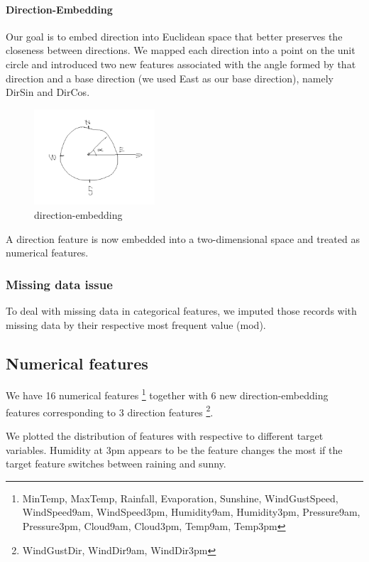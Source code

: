 \documentclass{article}
\begin{document}
\paragraph{Direction-Embedding}

Our goal is to embed direction into Euclidean space that better preserves the closeness between directions. We mapped each direction into a point on the unit circle and introduced two new features associated with the angle formed by that direction and a base direction (we used East as our base direction), namely DirSin and DirCos.

\begin{figure}[h!]
\centering
\includegraphics[width=0.4\textwidth]{direction-embedding.png}
\caption{direction-embedding}
\label{fig:direction-embedding}
\end{figure}

A direction feature is now embedded into a two-dimensional space and treated as numerical features.

\subsubsection{Missing data issue}

To deal with missing data in categorical features, we imputed those records with missing data by their respective most frequent value (mod).

\subsection{Numerical features}

We have 16 numerical features \footnote{MinTemp, MaxTemp, Rainfall, Evaporation, Sunshine, WindGustSpeed, WindSpeed9am, WindSpeed3pm, Humidity9am, Humidity3pm, Pressure9am, Pressure3pm, Cloud9am, Cloud3pm, Temp9am, Temp3pm} together with 6 new direction-embedding features corresponding to 3 direction features \footnote{WindGustDir, WindDir9am, WindDir3pm}.

We plotted the distribution of features with respective to different target variables. Humidity at 3pm appears to be the feature changes the most if the target feature switches between raining and sunny.
\end{document}
